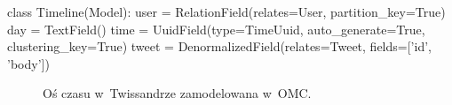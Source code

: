 \begin{verbbox}
	class Timeline(Model):
	    user = RelationField(relates=User,
	                         partition_key=True)
	    day = TextField()
	    time = UuidField(type=TimeUuid, 
	                     auto_generate=True,
	                     clustering_key=True)
	    tweet = DenormalizedField(relates=Tweet,
	                              fields=['id', 'body'])
\end{verbbox}

\begin{figure}[ht!]
	\centering
	\theverbbox
	\caption{Oś czasu w~Twissandrze zamodelowana w~OMC.}
	\label{vrb:omc_twissandra_timeline}
\end{figure}